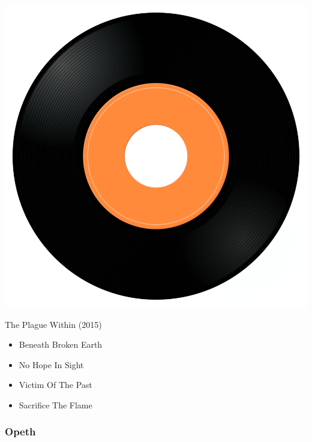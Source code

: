 \begin{minipage}[t]{0.25\textwidth}
\captionsetup{type=figure}
\includegraphics[width=\textwidth]{Images/cover.png}
\caption*{The Plague Within (2015)}
\end{minipage}
\begin{minipage}[t]{0.25\textwidth}\vspace{0pt}
\begin{itemize}[nosep,leftmargin=1em,labelwidth=*,align=left]
	\setlength{\itemsep}{0pt}
	\item Beneath Broken Earth
	\item No Hope In Sight
	\item Victim Of The Past
	\item Sacrifice The Flame
\end{itemize}
\end{minipage}

\subsubsection{Opeth}

